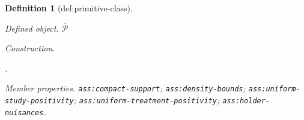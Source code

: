 \documentclass{article}
\newtheorem{definition}{Definition}
\begin{document}
\begin{definition}[def:primitive-class]\label{def:primitive-class}
\par\smallskip\noindent\emph{Defined object.} \(\overline{\mathcal P}\)
\par\smallskip\noindent\emph{Construction.} \par\noindent {}\par\noindent.
\par\smallskip\noindent\emph{Member properties.} \texttt{ass:\allowbreak{}compact-\allowbreak{}support}; \texttt{ass:\allowbreak{}density-\allowbreak{}bounds}; \texttt{ass:\allowbreak{}uniform-\allowbreak{}study-\allowbreak{}positivity}; \texttt{ass:\allowbreak{}uniform-\allowbreak{}treatment-\allowbreak{}positivity}; \texttt{ass:\allowbreak{}holder-\allowbreak{}nuisances}.
\end{definition}
\end{document}
